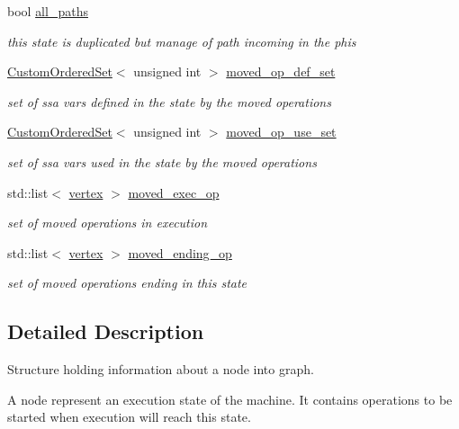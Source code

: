 \begin{DoxyCompactItemize}
bool \hyperlink{structStateInfo_ae0b73ddc83acae2d5e1ffb6d01894b57}{all\+\_\+paths}
\begin{DoxyCompactList}\small\item\em this state is duplicated but manage of path incoming in the phis \end{DoxyCompactList}\item 
\hyperlink{classCustomOrderedSet}{Custom\+Ordered\+Set}$<$ unsigned int $>$ \hyperlink{structStateInfo_a19945c7bebd3e104f6003e24e224856c}{moved\+\_\+op\+\_\+def\+\_\+set}
\begin{DoxyCompactList}\small\item\em set of ssa vars defined in the state by the moved operations \end{DoxyCompactList}\item 
\hyperlink{classCustomOrderedSet}{Custom\+Ordered\+Set}$<$ unsigned int $>$ \hyperlink{structStateInfo_a8a506af4e9a00aa0d390b384f8ad60b2}{moved\+\_\+op\+\_\+use\+\_\+set}
\begin{DoxyCompactList}\small\item\em set of ssa vars used in the state by the moved operations \end{DoxyCompactList}\item 
std\+::list$<$ \hyperlink{graph_8hpp_abefdcf0544e601805af44eca032cca14}{vertex} $>$ \hyperlink{structStateInfo_a41fc3ae3e3b718e7081f254e2b2a9dd0}{moved\+\_\+exec\+\_\+op}
\begin{DoxyCompactList}\small\item\em set of moved operations in execution \end{DoxyCompactList}\item 
std\+::list$<$ \hyperlink{graph_8hpp_abefdcf0544e601805af44eca032cca14}{vertex} $>$ \hyperlink{structStateInfo_aa4fe1013312b3b0cd7b9f3e64be4f57e}{moved\+\_\+ending\+\_\+op}
\begin{DoxyCompactList}\small\item\em set of moved operations ending in this state \end{DoxyCompactList}\end{DoxyCompactItemize}


\subsection{Detailed Description}
Structure holding information about a node into graph. 

A node represent an execution state of the machine. It contains operations to be started when execution will reach this state. 

